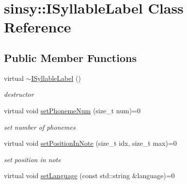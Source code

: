 \hypertarget{classsinsy_1_1ISyllableLabel}{\section{sinsy\-:\-:\-I\-Syllable\-Label \-Class \-Reference}
\label{classsinsy_1_1ISyllableLabel}
}
\subsection*{\-Public \-Member \-Functions}
\begin{DoxyCompactItemize}
\item 
\hypertarget{classsinsy_1_1ISyllableLabel_a8676d776bfc6d5938044083271ad005b}{virtual \hyperlink{classsinsy_1_1ISyllableLabel_a8676d776bfc6d5938044083271ad005b}{$\sim$\-I\-Syllable\-Label} ()}\label{classsinsy_1_1ISyllableLabel_a8676d776bfc6d5938044083271ad005b}

\begin{DoxyCompactList}\small\item\em destructor \end{DoxyCompactList}\item 
\hypertarget{classsinsy_1_1ISyllableLabel_acc166ab50fd7af6f4e5c23e08e46f2f1}{virtual void \hyperlink{classsinsy_1_1ISyllableLabel_acc166ab50fd7af6f4e5c23e08e46f2f1}{set\-Phoneme\-Num} (size\-\_\-t num)=0}\label{classsinsy_1_1ISyllableLabel_acc166ab50fd7af6f4e5c23e08e46f2f1}

\begin{DoxyCompactList}\small\item\em set number of phonemes \end{DoxyCompactList}\item 
\hypertarget{classsinsy_1_1ISyllableLabel_ae36d20bc3c756c3a6fb26b7c378ac754}{virtual void \hyperlink{classsinsy_1_1ISyllableLabel_ae36d20bc3c756c3a6fb26b7c378ac754}{set\-Position\-In\-Note} (size\-\_\-t idx, size\-\_\-t max)=0}\label{classsinsy_1_1ISyllableLabel_ae36d20bc3c756c3a6fb26b7c378ac754}

\begin{DoxyCompactList}\small\item\em set position in note \end{DoxyCompactList}\item 
\hypertarget{classsinsy_1_1ISyllableLabel_a4452a2097df590bd00c428fbbb0a5d34}{virtual void \hyperlink{classsinsy_1_1ISyllableLabel_a4452a2097df590bd00c428fbbb0a5d34}{set\-Language} (const std\-::string \&language)=0}\label{classsinsy_1_1ISyllableLabel_a4452a2097df590bd00c428fbbb0a5d34}


\end{DoxyCompactItemize}
